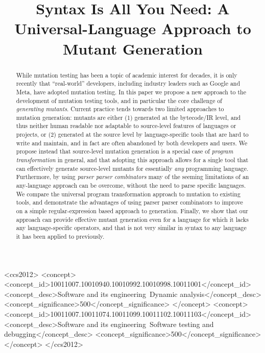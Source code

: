 \documentclass[sigconf,review, anonymous]{acmart}
\title{Syntax Is All You Need: A Universal-Language Approach to Mutant Generation}
\begin{document}
\begin{abstract}
While mutation testing has been a topic of academic interest for
decades, it is only recently that ``real-world'' developers, including
industry leaders such as Google and Meta, have adopted mutation
testing.  In this paper we propose a new approach to the development of mutation
testing tools, and in particular the core challenge of
\emph{generating mutants}.  Current practice tends towards two
limited approaches to mutation generation: mutants are either (1)
generated at the bytecode/IR level, and thus neither human readable
nor adaptable to source-level features of languages or projects, or
(2) generated at the source level by language-specific tools that are
hard to write and maintain, and in fact are often abandoned by both
developers and users.  We propose instead that source-level mutation
generation is a special case of \emph{program transformation} in
general, and that adopting this approach allows for a single tool that
can effectively generate source-level mutants for essentially
\emph{any} programming language. Furthermore, by using \emph{parser
  parser combinators} many of the seeming limitations of an
any-language approach can be overcome, without the need to parse
specific languages.  We compare the universal program transformation
approach to mutation to existing tools, and demonstrate the advantages
of using parser parser combinators to improve on a simple regular-expression
based approach to generation.  Finally, we show that our approach
can provide effective mutant generation even for a language for which
it lacks any language-specific operators, and that is not very similar
in syntax to any language it has been applied to previously.
\end{abstract}


\begin{CCSXML}
<ccs2012>
<concept>
<concept_id>10011007.10010940.10010992.10010998.10011001</concept_id>
<concept_desc>Software and its engineering~Dynamic analysis</concept_desc>
<concept_significance>500</concept_significance>
</concept>
<concept>
<concept_id>10011007.10011074.10011099.10011102.10011103</concept_id>
<concept_desc>Software and its engineering~Software testing and debugging</concept_desc>
<concept_significance>500</concept_significance>
</concept>
</ccs2012>
\end{CCSXML}

\end{document}
